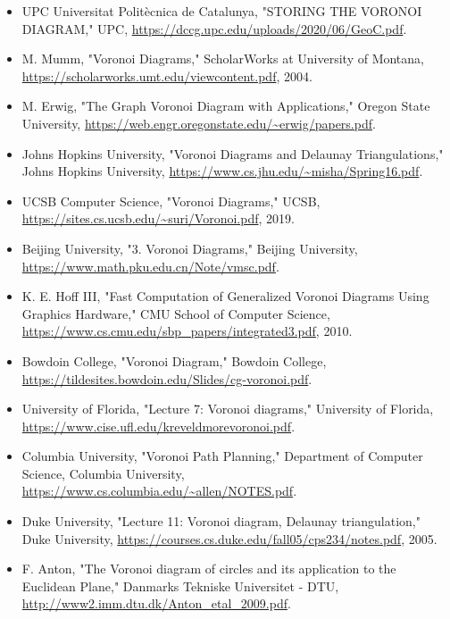 \documentclass[12pt,a4paper]{report}
\begin{document}
\begin{itemize}
  \item UPC Universitat Politècnica de Catalunya, "STORING THE VORONOI DIAGRAM," UPC, \url{https://dccg.upc.edu/uploads/2020/06/GeoC.pdf}.
  
  \item M. Mumm, "Voronoi Diagrams," ScholarWorks at University of Montana, \url{https://scholarworks.umt.edu/viewcontent.pdf}, 2004.
  
  \item M. Erwig, "The Graph Voronoi Diagram with Applications," Oregon State University, \url{https://web.engr.oregonstate.edu/~erwig/papers.pdf}.
  
  \item Johns Hopkins University, "Voronoi Diagrams and Delaunay Triangulations," Johns Hopkins University, \url{https://www.cs.jhu.edu/~misha/Spring16.pdf}.
  
  \item UCSB Computer Science, "Voronoi Diagrams," UCSB, \url{https://sites.cs.ucsb.edu/~suri/Voronoi.pdf}, 2019.
  
  \item Beijing University, "3. Voronoi Diagrams," Beijing University, \url{https://www.math.pku.edu.cn/Note/vmsc.pdf}.
  
  \item K. E. Hoff III, "Fast Computation of Generalized Voronoi Diagrams Using Graphics Hardware," CMU School of Computer Science, \url{https://www.cs.cmu.edu/sbp_papers/integrated3.pdf}, 2010.
  
  \item Bowdoin College, "Voronoi Diagram," Bowdoin College, \url{https://tildesites.bowdoin.edu/Slides/cg-voronoi.pdf}.
  
  \item University of Florida, "Lecture 7: Voronoi diagrams," University of Florida, \url{https://www.cise.ufl.edu/kreveldmorevoronoi.pdf}.
  
  \item Columbia University, "Voronoi Path Planning," Department of Computer Science, Columbia University, \url{https://www.cs.columbia.edu/~allen/NOTES.pdf}.
  
  \item Duke University, "Lecture 11: Voronoi diagram, Delaunay triangulation," Duke University, \url{https://courses.cs.duke.edu/fall05/cps234/notes.pdf}, 2005.
  
  \item F. Anton, "The Voronoi diagram of circles and its application to the Euclidean Plane," Danmarks Tekniske Universitet - DTU, \url{http://www2.imm.dtu.dk/Anton_etal_2009.pdf}.
  

\end{itemize}
\end{document}
